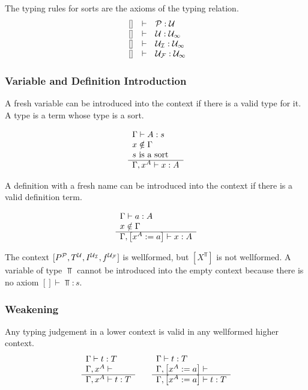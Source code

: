 The typing rules for sorts are the axioms of the typing relation.
$$
\begin{array}{lllll} 
    \ []  &\vdash& {\mathcal P}: {\mathcal U}
    \\
    \ []  &\vdash& {\mathcal U}: {{\mathcal U}_\infty}
    \\
    \ []  &\vdash& {{\mathcal U}_\mathcal I}: {{\mathcal U}_\infty}
    \\
    \ []  &\vdash& {{\mathcal U}_\mathcal F}: {{\mathcal U}_\infty}
 \end{array}
$$




\subsubsection{Variable and Definition Introduction}

A fresh variable can be introduced into the context if there is a valid type for
it. A type is a term whose type is a sort.

$$
\begin{array}{l} 
    \Gamma \vdash A : s
    \\
    x \notin \Gamma
    \\
    s \text{ is a sort}
 \\ \hline 
    \Gamma, x^A \vdash x : A
 \end{array}
$$

A definition with a fresh name can be introduced into the context if there is a
valid definition term.

$$
\begin{array}{l} 
    \Gamma \vdash a : A
    \\
    x \notin \Gamma
 \\ \hline 
    \Gamma, \left[ {x^A := a} \right] \vdash x: A
 \end{array}
$$

The context $[P^{\mathcal P}, T^{\mathcal U}, I^{{\mathcal U}_\mathcal I}, f^{{\mathcal U}_\mathcal F}]$ is wellformed, but
$[X^\Top]$ is not wellformed. A variable of type $\Top$ cannot be introduced
into the empty context because there is no axiom $[] \vdash \Top: s$.






\subsubsection{Weakening}

Any typing judgement in a lower context is valid in any wellformed higher
context.
$$
\begin{array}{l} 
    \Gamma \vdash t : T
    \\
    \Gamma, x^A \vdash
 \\ \hline 
    \Gamma, x^A \vdash t : T
 \end{array}
\quad\quad
\begin{array}{l} 
    \Gamma \vdash t : T
    \\
    \Gamma, \left[ {x^A := a} \right] \vdash
 \\ \hline 
    \Gamma, \left[ {x^A := a} \right] \vdash t : T
 \end{array}
$$





